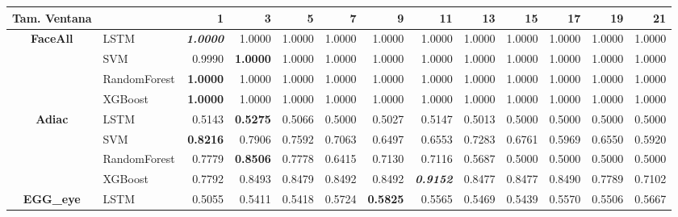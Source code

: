 \begin{table}[H]
	\centering
	\begin{adjustbox}{max width=14cm}
		\begin{tabular}{|c|l|r|r|r|r|r|r|r|r|r|r|r|}
			\hline
			\textbf{Tam. Ventana} &              & 1               & 3      & 5      & 7               & 9               & 11              & 13     & 15     & 17              & 19     & 21              \\
			\hline
			\textbf{FaceAll}      & LSTM         & \textit{\textbf{1.0000}} & 1.0000 & 1.0000 & 1.0000          & 1.0000          & 1.0000          & 1.0000 & 1.0000 & 1.0000          & 1.0000 & 1.0000          \\
			                      & SVM          & 0.9990          & \textbf{1.0000} & 1.0000 & 1.0000          & 1.0000          & 1.0000          & 1.0000 & 1.0000 & 1.0000          & 1.0000 & 1.0000          \\
			                      & RandomForest & \textbf{1.0000}          & 1.0000 & 1.0000 & 1.0000          & 1.0000          & 1.0000          & 1.0000 & 1.0000 & 1.0000          & 1.0000 & 1.0000          \\
			                      & XGBoost      & \textbf{1.0000}          & 1.0000 & 1.0000 & 1.0000          & 1.0000          & 1.0000          & 1.0000 & 1.0000 & 1.0000          & 1.0000 & 1.0000          \\
			\hline
			\textbf{Adiac}        & LSTM         & 0.5143          & \textbf{0.5275} & 0.5066 & 0.5000          & 0.5027          & 0.5147          & 0.5013 & 0.5000 & 0.5000          & 0.5000 & 0.5000          \\
			                      & SVM          & \textbf{0.8216}          & 0.7906 & 0.7592 & 0.7063          & 0.6497          & 0.6553          & 0.7283 & 0.6761 & 0.5969          & 0.6550 & 0.5920          \\
			                      & RandomForest & 0.7779          & \textbf{0.8506} & 0.7778 & 0.6415          & 0.7130          & 0.7116          & 0.5687 & 0.5000 & 0.5000          & 0.5000 & 0.5000          \\
			                      & XGBoost      & 0.7792          & 0.8493 & 0.8479 & 0.8492          & 0.8492          & \textit{\textbf{0.9152}} & 0.8477 & 0.8477 & 0.8490          & 0.7789 & 0.7102          \\
			\hline
			\textbf{EGG\_eye}     & LSTM         & 0.5055          & 0.5411 & 0.5418 & 0.5724          & \textbf{0.5825}          & 0.5565          & 0.5469 & 0.5439 & 0.5570          & 0.5506 & 0.5667          \\

\end{tabular}
\end{adjustbox}
\end{table}
